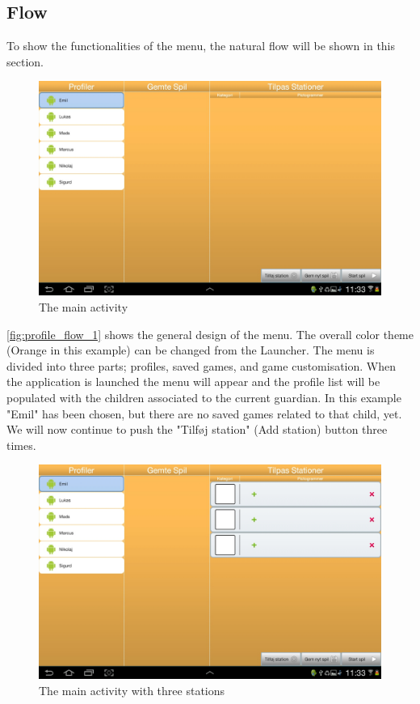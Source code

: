 \subsection{Flow}
To show the functionalities of the menu, the natural flow will be shown in this section.
\begin{figure}[H]
\centering
\includegraphics[width=1.0\linewidth]{img/screenshots/profile_flow_1.jpg}%
\caption{The main activity}
\label{fig:profile_flow_1}
\end{figure}
\autoref{fig:profile_flow_1} shows the general design of the menu. The overall color theme (Orange in this example) can be changed from the Launcher. The menu is divided into three parts; profiles, saved games, and game customisation. When the application is launched the menu will appear and the profile list will be populated with the children associated to the current guardian. In this example "Emil" has been chosen, but there are no saved games related to that child, yet.
We will now continue to push the "Tilføj station" (Add station) button three times.

\begin{figure}[H]
\centering
\includegraphics[width=1.0\linewidth]{img/screenshots/profile_flow_2.jpg}%
\caption{The main activity with three stations}
\label{fig:profile_flow_2}
\end{figure}

